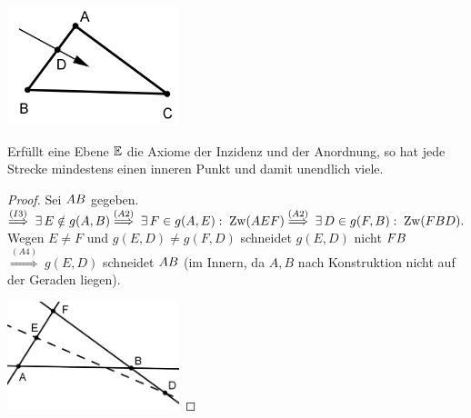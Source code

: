 
\centerline{\includegraphics[width=5cm]{BILDER/1-1-04-Pasch.png}}






\begin{thm}
Erfüllt eine Ebene $\mathbb E$ die Axiome der Inzidenz und der
Anordnung, so hat
jede Strecke mindestens einen inneren Punkt und damit unendlich
viele.
\end{thm}

\begin{proof}
Sei ${AB}$ gegeben.\\
$\stackrel{(I3)}{\Longrightarrow}\;\exists\,E\notin g(A,B)\\
\stackrel{(A2)}{\Longrightarrow}\;\exists\,F\in g(A,E):\;\operatorname{Zw}(AEF)\\
\stackrel{(A2)}{\Longrightarrow}\;\exists\,D\in g(F,B):\;\operatorname{Zw}(FBD).$\\
Wegen $E\neq F$ und $g(E,D)\neq g(F,D)$ schneidet $g(E,D)$ nicht
${FB}$\\
$\stackrel{(A4)}{\Longrightarrow}\; g(E,D)$ schneidet ${AB}$ (im
Innern, da $A,B$ nach Konstruktion nicht auf der Geraden liegen).

\medskip

\centerline{\includegraphics[width=5cm]{BILDER/1-1-05-Satz.png}}

\end{proof}




